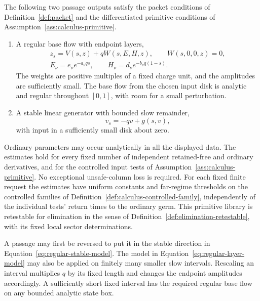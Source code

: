 \begin{theorem}\label{thm:regular-packets}
The following two passage outputs satisfy the packet conditions of
Definition~\ref{def:packet} and the differentiated primitive conditions of
Assumption~\ref{ass:calculus-primitive}.
\begin{enumerate}
\item A regular base flow with endpoint layers,
\begin{equation}\label{eq:regular-layer-model}
 \begin{gathered}
 z_s=V(s,z)+qW(s,E,H,z),\qquad W(s,0,0,z)=0,\\
 E_\nu=e_\nu e^{-a_\nu qs},\qquad
 H_\nu=d_\nu e^{-b_\nu q(1-s)}.
 \end{gathered}
\end{equation}
The weights are positive multiples of a fixed charge unit, and the
amplitudes are sufficiently small.  The base flow from the chosen input
disk is analytic and regular throughout $[0,1]$, with room for a small
perturbation.
\item A stable linear generator with bounded slow remainder,
\begin{equation}\label{eq:regular-stable-model}
 v_s=-qv+g(s,v),
\end{equation}
with input in a sufficiently small disk about zero.
\end{enumerate}
Ordinary parameters may occur analytically in all the displayed data.
The estimates hold for every fixed number of independent retained-free
and ordinary derivatives, and for the controlled input tests of
Assumption~\ref{ass:calculus-primitive}.  No exceptional unsafe-column
loss is required.  For each fixed finite request the estimates have
uniform constants and far-regime thresholds on the controlled families
of Definition~\ref{def:calculus-controlled-family}, independently of
the individual tests' return times to the ordinary germ.
This primitive library is retestable for elimination
in the sense of Definition~\ref{def:elimination-retestable}, with its
fixed local sector determinations.
\end{theorem}

A passage may first be reversed to put it in the stable direction in
Equation~\eqref{eq:regular-stable-model}.  The model in
Equation~\eqref{eq:regular-layer-model}
may also be applied on finitely many smaller slow intervals.  Rescaling
an interval multiplies $q$ by its fixed length and changes the endpoint
amplitudes accordingly.  A sufficiently short fixed interval has the
required regular base flow on any bounded analytic state box.

